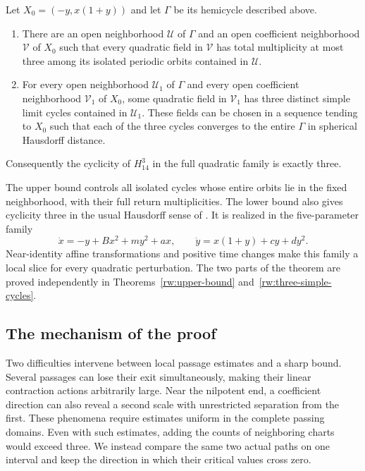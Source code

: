 \begin{theorem}\label{rw:main:cyclicity}
Let $X_0=(-y,x(1+y))$ and let $\Gamma$ be its hemicycle described
above.
\begin{enumerate}[label=\textup{(\roman*)}]
\item There are an open neighborhood $\mathscr U$ of $\Gamma$ and
an open coefficient neighborhood $\mathscr V$ of $X_0$ such that
every quadratic field in $\mathscr V$ has total multiplicity at most
three among its isolated periodic orbits contained in $\mathscr U$.
\item For every open neighborhood $\mathscr U_1$ of $\Gamma$ and
every open coefficient neighborhood $\mathscr V_1$ of $X_0$, some
quadratic field in $\mathscr V_1$ has three distinct simple limit
cycles contained in $\mathscr U_1$.
These fields can be chosen in a sequence tending to $X_0$ such that
each of the three cycles converges to the entire $\Gamma$ in spherical
Hausdorff distance.
\end{enumerate}
Consequently the cyclicity of $H_{14}^{3}$ in the full quadratic
family is exactly three.
\end{theorem}

The upper bound controls all isolated cycles whose entire orbits lie
in the fixed neighborhood, with their full return multiplicities.
The lower bound also gives cyclicity three in the usual Hausdorff
sense of \cite[Definition~2.1]{RoussarieRousseau2015}. It is realized
in the five-parameter family
\[
 \dot x=-y+Bx^2+my^2+ax,\qquad
 \dot y=x(1+y)+cy+dy^2.
\]
Near-identity affine transformations and positive time changes make
this family a local slice for every quadratic perturbation. The two
parts of the theorem are proved independently in
Theorems~\ref{rw:upper-bound} and~\ref{rw:three-simple-cycles}.



\subsection{The mechanism of the proof}

Two difficulties intervene between local passage estimates and a sharp
bound. Several passages can lose their exit simultaneously, making
their linear contraction actions arbitrarily large. Near the nilpotent
end, a coefficient direction can also reveal a second scale with
unrestricted separation from the first. These phenomena require
estimates uniform in the complete passing domains. Even with such
estimates, adding the counts of neighboring charts would exceed three.
We instead compare the same two actual paths on one interval and
keep the direction in which their critical values cross zero.

